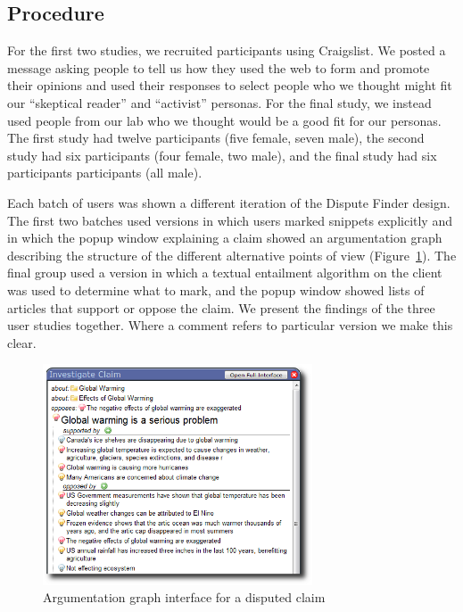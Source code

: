 \documentclass{www2010-submission}
\begin{document}
\subsection{Procedure}

For the first two studies, we recruited participants using Craigslist. We posted a message asking people to tell us how they used the web to form and promote their opinions and used their responses to select people who we thought might fit our ``skeptical reader'' and ``activist'' personas. For the final study, we instead used people from our lab who we thought would be a good fit for our personas. The first study had twelve participants (five female, seven male), the second study had six participants (four female, two male), and the final study had six participants participants (all male). 

Each batch of users was shown a different iteration of the Dispute Finder design. The first two batches used versions in which users marked snippets explicitly and in which the popup window explaining a claim showed an argumentation graph describing the structure of the different alternative points of view (Figure~\ref{popup_graph}). The final group used a version in which a textual entailment algorithm on the client was used to determine what to mark, and the popup window showed lists of articles that support or oppose the claim. We present the findings of the three user studies together. Where a comment refers to particular version we make this clear.

\begin{figure}[tb]
	\begin{center}
	\includegraphics[width=8cm]{pictures/popup_graph_crop.png}
	\caption{Argumentation graph interface for a disputed claim}
	\label{popup_graph}
	\end{center}
\end{figure}
\end{document}
